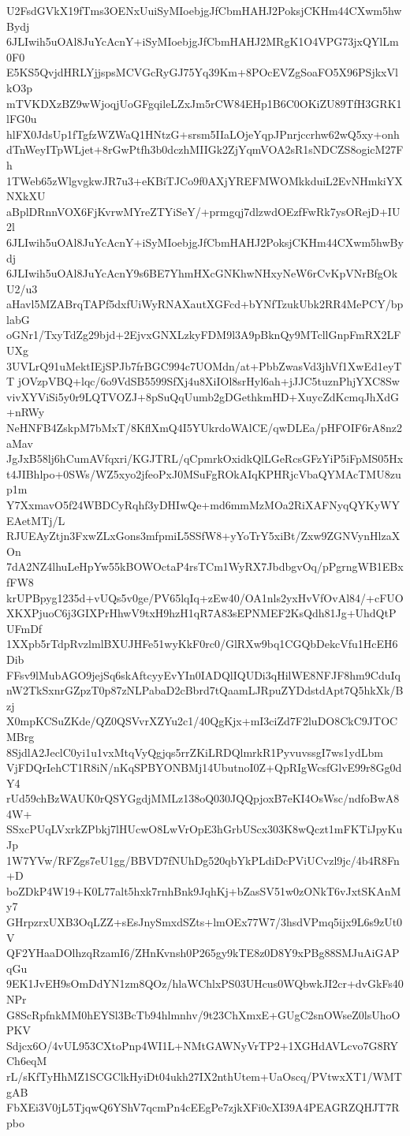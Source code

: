 U2FsdGVkX19fTms3OENxUuiSyMIoebjgJfCbmHAHJ2PoksjCKHm44CXwm5hwBydj
6JLIwih5uOAl8JuYcAcnY+iSyMIoebjgJfCbmHAHJ2MRgK1O4VPG73jxQYlLm0F0
E5KS5QvjdHRLYjjspsMCVGcRyGJ75Yq39Km+8POcEVZgSoaFO5X96PSjkxVlkO3p
mTVKDXzBZ9wWjoqjUoGFgqileLZxJm5rCW84EHp1B6C0OKiZU89TfH3GRK1lFG0u
hlFX0JdsUp1fTgfzWZWaQ1HNtzG+srsm5IIaLOjeYqpJPnrjccrhw62wQ5xy+onh
dTnWeyITpWLjet+8rGwPtfh3b0dczhMIIGk2ZjYqmVOA2sR1sNDCZS8ogicM27Fh
1TWeb65zWlgvgkwJR7u3+eKBiTJCo9f0AXjYREFMWOMkkduiL2EvNHmkiYXNXkXU
aBplDRnnVOX6FjKvrwMYreZTYiSeY/+prmgqj7dlzwdOEzfFwRk7ysORejD+IU2l
6JLIwih5uOAl8JuYcAcnY+iSyMIoebjgJfCbmHAHJ2PoksjCKHm44CXwm5hwBydj
6JLIwih5uOAl8JuYcAcnY9s6BE7YhmHXcGNKhwNHxyNeW6rCvKpVNrBfgOkU2/u3
aHavl5MZABrqTAPf5dxfUiWyRNAXautXGFcd+bYNfTzukUbk2RR4MePCY/bplabG
oGNr1/TxyTdZg29bjd+2EjvxGNXLzkyFDM9l3A9pBknQy9MTcllGnpFmRX2LFUXg
3UVLrQ91uMektIEjSPJb7frBGC994c7UOMdn/at+PbbZwasVd3jhVf1XwEd1eyTT
jOVzpVBQ+lqc/6o9VdSB5599SfXj4u8XiIOl8srHyl6ah+jJJC5tuznPhjYXC8Sw
vivXYViSi5y0r9LQTVOZJ+8pSuQqUumb2gDGethkmHD+XuycZdKcmqJhXdG+nRWy
NeHNFB4ZskpM7bMxT/8KflXmQ4I5YUkrdoWAlCE/qwDLEa/pHFOIF6rA8nz2aMav
JgJxB58lj6hCumAVfqxri/KGJTRL/qCpmrkOxidkQlLGeRcsGFzYiP5iFpMS05Hx
t4JIBhlpo+0SWs/WZ5xyo2jfeoPxJ0MSuFgROkAIqKPHRjcVbaQYMAcTMU8zup1m
Y7XxmavO5f24WBDCyRqhf3yDHIwQe+md6mmMzMOa2RiXAFNyqQYKyWYEAetMTj/L
RJUEAyZtjn3FxwZLxGons3mfpmiL5SSfW8+yYoTrY5xiBt/Zxw9ZGNVynHlzaXOn
7dA2NZ4lhuLeHpYw55kBOWOctaP4rsTCm1WyRX7JbdbgvOq/pPgrngWB1EBxfFW8
krUPBpyg1235d+vUQs5v0ge/PV65lqIq+zEw40/OA1nls2yxHvVfOvAl84/+cFUO
XKXPjuoC6j3GIXPrHhwV9txH9hzH1qR7A83sEPNMEF2KsQdh81Jg+UhdQtPUFmDf
1XXpb5rTdpRvzlmlBXUJHFe51wyKkF0rc0/GlRXw9bq1CGQbDekcVfu1HcEH6Dib
FFsv9lMubAGO9jejSq6skAftcyyEvYIn0IADQlIQUDi3qHilWE8NFJF8hm9CduIq
nW2TkSxnrGZpzT0p87zNLPabaD2cBbrd7tQaamLJRpuZYDdstdApt7Q5hkXk/Bzj
X0mpKCSuZKde/QZ0QSVvrXZYu2c1/40QgKjx+mI3ciZd7F2luDO8CkC9JTOCMBrg
8SjdlA2JeclC0yi1u1vxMtqVyQgjqs5rrZKiLRDQlmrkR1PyvuvssgI7ws1ydLbm
VjFDQrIehCT1R8iN/nKqSPBYONBMj14UbutnoI0Z+QpRIgWcsfGlvE99r8Gg0dY4
rUd59chBzWAUK0rQSYGgdjMMLz138oQ030JQQpjoxB7eKI4OsWsc/ndfoBwA84W+
SSxcPUqLVxrkZPbkj7lHUcwO8LwVrOpE3hGrbUScx303K8wQczt1mFKTiJpyKuJp
1W7YVw/RFZgs7eU1gg/BBVD7fNUhDg520qbYkPLdiDcPViUCvzl9jc/4b4R8Fn+D
boZDkP4W19+K0L77alt5hxk7rnhBnk9JqhKj+bZasSV51w0zONkT6vJxtSKAnMy7
GHrpzrxUXB3OqLZZ+sEsJnySmxdSZts+lmOEx77W7/3hsdVPmq5ijx9L6s9zUt0V
QF2YHaaDOlhzqRzamI6/ZHnKvnsh0P265gy9kTE8z0D8Y9xPBg88SMJuAiGAPqGu
9EK1JvEH9sOmDdYN1zm8QOz/hlaWChlxPS03UHcus0WQbwkJI2cr+dvGkFs40NPr
G8ScRpfnkMM0hEYSl3BcTb94hlmnhv/9t23ChXmxE+GUgC2snOWseZ0lsUhoOPKV
Sdjcx6O/4vUL953CXtoPnp4WI1L+NMtGAWNyVrTP2+1XGHdAVLcvo7G8RYCh6eqM
rL/sKfTyHhMZ1SCGClkHyiDt04ukh27IX2nthUtem+UaOscq/PVtwxXT1/WMTgAB
FbXEi3V0jL5TjqwQ6YShV7qcmPn4cEEgPe7zjkXFi0cXI39A4PEAGRZQHJT7Rpbo
